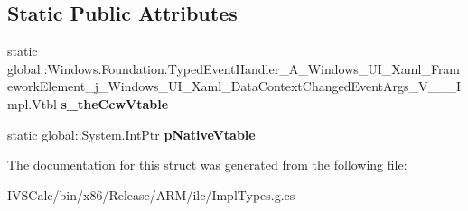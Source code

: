 \subsection*{Static Public Attributes}
\begin{DoxyCompactItemize}
\item 
\mbox{\label{struct_windows_1_1_foundation_1_1_typed_event_handler___a___windows___u_i___xaml___framework_ele0f0aa82fcf85c345ad8a6f22953a8130_acab35b779f431d8d5643ae5c3d8c35ca}} 
static global\+::\+Windows.\+Foundation.\+Typed\+Event\+Handler\+\_\+\+A\+\_\+\+Windows\+\_\+\+U\+I\+\_\+\+Xaml\+\_\+\+Framework\+Element\+\_\+j\+\_\+\+Windows\+\_\+\+U\+I\+\_\+\+Xaml\+\_\+\+Data\+Context\+Changed\+Event\+Args\+\_\+\+V\+\_\+\+\_\+\+\_\+\+Impl.\+Vtbl {\bfseries s\+\_\+the\+Ccw\+Vtable}
\item 
\mbox{\label{struct_windows_1_1_foundation_1_1_typed_event_handler___a___windows___u_i___xaml___framework_ele0f0aa82fcf85c345ad8a6f22953a8130_a444a2cd2385843a4d28b69cf26c85aa9}} 
static global\+::\+System.\+Int\+Ptr {\bfseries p\+Native\+Vtable}
\end{DoxyCompactItemize}


The documentation for this struct was generated from the following file\+:\begin{DoxyCompactItemize}
\item 
I\+V\+S\+Calc/bin/x86/\+Release/\+A\+R\+M/ilc/Impl\+Types.\+g.\+cs\end{DoxyCompactItemize}
